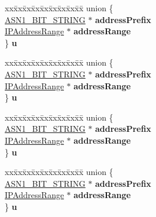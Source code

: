 \begin{DoxyCompactItemize}
\begin{tabbing}
\end{tabbing}\item 
\mbox{\label{structIPAddressOrRange__st_a0c253d972e4cc578d6ab0a096ca54828}} 
\begin{tabbing}
xx\=xx\=xx\=xx\=xx\=xx\=xx\=xx\=xx\=\kill
union \{\\
\>\hyperlink{structasn1__string__st}{ASN1\_BIT\_STRING} $\ast$ {\bfseries addressPrefix}\\
\>\hyperlink{structIPAddressRange__st}{IPAddressRange} $\ast$ {\bfseries addressRange}\\
\} {\bfseries u}\\

\end{tabbing}\item 
\mbox{\label{structIPAddressOrRange__st_a4d999220d2ee49c3383e30eff65794b3}} 
\begin{tabbing}
xx\=xx\=xx\=xx\=xx\=xx\=xx\=xx\=xx\=\kill
union \{\\
\>\hyperlink{structasn1__string__st}{ASN1\_BIT\_STRING} $\ast$ {\bfseries addressPrefix}\\
\>\hyperlink{structIPAddressRange__st}{IPAddressRange} $\ast$ {\bfseries addressRange}\\
\} {\bfseries u}\\

\end{tabbing}\item 
\mbox{\label{structIPAddressOrRange__st_a2ea72e34add438028da0a8bc72a88e4d}} 
\begin{tabbing}
xx\=xx\=xx\=xx\=xx\=xx\=xx\=xx\=xx\=\kill
union \{\\
\>\hyperlink{structasn1__string__st}{ASN1\_BIT\_STRING} $\ast$ {\bfseries addressPrefix}\\
\>\hyperlink{structIPAddressRange__st}{IPAddressRange} $\ast$ {\bfseries addressRange}\\
\} {\bfseries u}\\

\end{tabbing}\item 
\mbox{\label{structIPAddressOrRange__st_acdd999705a9add4c879dd1b3b4e066a7}} 
\begin{tabbing}
xx\=xx\=xx\=xx\=xx\=xx\=xx\=xx\=xx\=\kill
union \{\\
\>\hyperlink{structasn1__string__st}{ASN1\_BIT\_STRING} $\ast$ {\bfseries addressPrefix}\\
\>\hyperlink{structIPAddressRange__st}{IPAddressRange} $\ast$ {\bfseries addressRange}\\
\} {\bfseries u}\\


\end{tabbing}
\end{DoxyCompactItemize}
